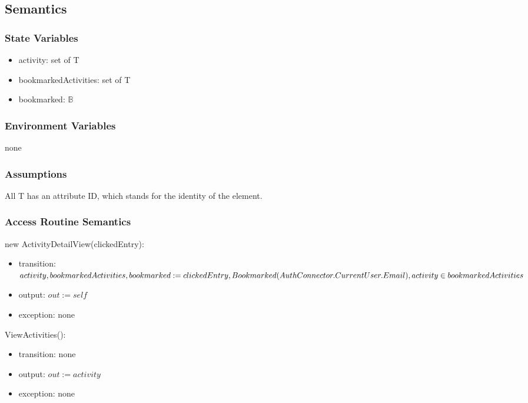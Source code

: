 \documentclass[12pt, titlepage]{article}
\begin{document}
\subsection{Semantics}

\subsubsection{State Variables}

\begin{itemize}
  \item activity: set of T
  \item bookmarkedActivities: set of T
  \item bookmarked: $\mathbb{B}$
\end{itemize}

\subsubsection{Environment Variables}

none

\subsubsection{Assumptions}

All T has an attribute ID, which stands for the identity of the element.

\subsubsection{Access Routine Semantics}

\noindent new ActivityDetailView(clickedEntry):
\begin{itemize}
\item transition: $activity, bookmarkedActivities, bookmarked:= clickedEntry,\\ Bookmarked(AuthConnector.CurrentUser.Email), activity \in bookmarkedActivities$
\item output: $out := self$
\item exception: none
\end{itemize}

\noindent ViewActivities():
\begin{itemize}
\item transition: none
\item output: $out := activity$
\item exception: none
\end{itemize}
\end{document}
